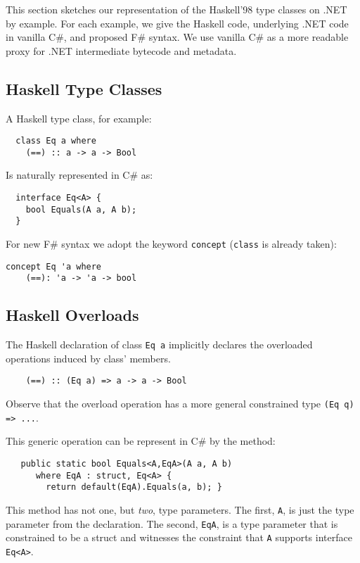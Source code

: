 \documentclass[preprint]{sig-alternate-05-2015}
\begin{document}
This section sketches our representation of the Haskell'98 type classes on .NET by example.
For each example, we give the Haskell code, underlying .NET code in vanilla C\#, and proposed F\# syntax.
We use vanilla C\# as a more readable proxy for .NET intermediate bytecode and metadata.

\subsection{Haskell Type Classes}

A Haskell type class, for example:

{
\begin{lstlisting}
  class Eq a where 
    (==) :: a -> a -> Bool
\end{lstlisting}
}
Is naturally represented in C\# as:
\begin{lstlisting}
  interface Eq<A> {
    bool Equals(A a, A b);
  }
\end{lstlisting}

For new F\# syntax we adopt the keyword \lstinline{concept} (\lstinline{class} is already taken):

\begin{lstlisting}
concept Eq 'a where 
    (==): 'a -> 'a -> bool
\end{lstlisting}
 
\subsection{Haskell Overloads}

The Haskell declaration of class \lstinline{Eq a} implicitly declares the overloaded 
operations induced by class' members.

\begin{lstlisting}
    (==) :: (Eq a) => a -> a -> Bool 
\end{lstlisting}
Observe that the overload operation has a more general constrained type \lstinline{(Eq q) => ...}.

This generic operation can be represent in C\# by the method:
\begin{lstlisting}
   public static bool Equals<A,EqA>(A a, A b) 
      where EqA : struct, Eq<A> {
        return default(EqA).Equals(a, b); }
\end{lstlisting}
This method has not one, but \emph{two}, type parameters. The first, \lstinline{A}, is just the type parameter from the declaration.
The second, \lstinline{EqA}, is a type parameter that is constrained to be a struct and witnesses the constraint that \lstinline{A} supports interface \lstinline{Eq<A>}.
\end{document}
